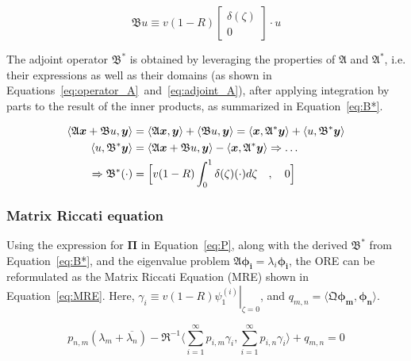 \begin{equation} \label{eq:B}
    \mathfrak{B} u \equiv v(1-R)
    \begin{bmatrix}
        \delta(\zeta) \\ 0
    \end{bmatrix} \cdot u
\end{equation}

The adjoint operator $\mathfrak{B}^*$ is obtained by leveraging the properties of $\mathfrak{A}$ and $\mathfrak{A}^*$, i.e. their expressions as well as their domains (as shown in Equations~\ref{eq:operator_A}~and~\ref{eq:adjoint_A}), after applying integration by parts to the result of the inner products, as summarized in Equation~\ref{eq:B*}.

\begin{equation} \label{eq:B*}
    \begin{aligned}
        \langle \mathfrak{A} \bm{x} + \mathfrak{B} u, \bm{y} \rangle
        &= \langle \mathfrak{A} \bm{x}, \bm{y} \rangle
        + \langle \mathfrak{B} u, \bm{y} \rangle
        = \langle \bm{x}, \mathfrak{A}^* \bm{y}\rangle
        + \langle u, \mathfrak{B}^* \bm{y} \rangle \\
        \langle u, \mathfrak{B}^* \bm{y} \rangle
        &= \langle \mathfrak{A} \bm{x} + \mathfrak{B} u, \bm{y} \rangle
        - \langle \bm{x}, \mathfrak{A}^* \bm{y}\rangle
        \Rightarrow \hdots \\ \Rightarrow \mathfrak{B}^* (\cdot) &= \Bigl[ v(1-R) \int_0^1 \delta(\zeta) (\cdot) d\zeta \quad , \quad 0 \Bigr]
    \end{aligned}
\end{equation}

\subsubsection{Matrix Riccati equation}

Using the expression for $\mathbf{\Pi}$ in Equation~\ref{eq:P}, along with the derived $\mathfrak{B}^*$ from Equation~\ref{eq:B*}, and the eigenvalue problem $\mathfrak{A}\bm{\phi_i} = \lambda_i \bm{\phi_i}$, the ORE can be reformulated as the Matrix Riccati Equation (MRE) shown in Equation~\ref{eq:MRE}. Here, $\gamma_i \equiv v(1-R) \left. \psi_{1}^{(i)} \right|_{\zeta = 0}$, and $q_{m,n} = \langle \mathfrak{Q} \bm{\phi_m}, \bm{\phi_n} \rangle$.

\begin{equation}\label{eq:MRE}
    p_{n,m} (\lambda_m + \overline{\lambda_n})
    - \mathfrak{R}^{-1} \langle \sum_{i=1}^\infty p_{i,m} \gamma_i, \sum_{i=1}^\infty p_{i,n} \gamma_i \rangle
    + q_{m,n} = 0
\end{equation}

